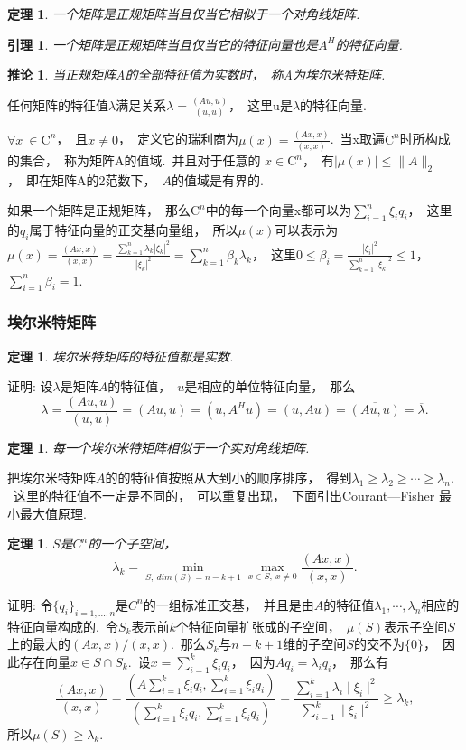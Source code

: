 \documentclass{article}
\begin{document}
\newtheorem{thm}{定理}
\begin{thm}
一个矩阵是正规矩阵当且仅当它相似于一个对角线矩阵.
\end{thm}

\newtheorem{lemma}{引理}
\begin{lemma}
一个矩阵是正规矩阵当且仅当它的特征向量也是$A^H$的特征向量.
\end{lemma}

\newtheorem{corollary}{推论}
\begin{corollary}
当正规矩阵A的全部特征值为实数时，~称A为埃尔米特矩阵.
\end{corollary}
任何矩阵的特征值$\lambda$满足关系$\lambda =\frac{(Au,u)}{(u,u)}$，~这里u是$\lambda$的特征向量.

$\forall x \ \in\mathrm{C}^n$，~且$x\neq 0$，~定义它的瑞利商为$\mu (x)=\frac{(Ax,x)}{(x,x)}$.\ 当x取遍$\mathrm{C}^n$时所构成的集合，~称为矩阵A的值域.\ 并且对于任意的 $x \in\mathrm{C}^n$，~有$|\mu (x)|\leqslant \parallel A\parallel _2$，~即在矩阵A的2范数下，~$A$的值域是有界的.

如果一个矩阵是正规矩阵，~那么$\mathrm{C}^n$中的每一个向量x都可以为$\sum_{i=1}^n \xi _i q_i$，~这里的$q_i$属于特征向量的正交基向量组，~所以$\mu (x)$可以表示为$\mu (x)=\frac{(Ax,x)}{(x,x)}=\frac{\sum_{k=1}^n \lambda _k|\xi _k|^2}{|\xi _k|^2}=\sum_{k=1}^n \beta _k\lambda _k$，~这里$0\leqslant \beta _i=\frac{|\xi _i|^2}{\sum_{k=1}^n |\xi _k|^2}\leqslant 1$，~$\sum_{i=1}^n \beta _i=1$.

\subsubsection{埃尔米特矩阵}
\newtheorem{thm}{定理}
\begin{thm}
埃尔米特矩阵的特征值都是实数.
\end{thm}
证明:
设$\lambda$是矩阵$A$的特征值，~$u$是相应的单位特征向量，~那么
$$\lambda=\frac{(Au,u)}{(u,u)}=(Au,u)=(u,A^{H}u)=(u,Au)=\overline{(Au,u)}=\overline{\lambda}.$$


\newtheorem{thm}{定理}
\begin{thm}
每一个埃尔米特矩阵相似于一个实对角线矩阵.
\end{thm}

把埃尔米特矩阵$A$的的特征值按照从大到小的顺序排序，~得到$\lambda _1\ge \lambda _2\ge \cdots\ge\lambda _n.$\ 这里的特征值不一定是不同的，~可以重复出现，~下面引出Courant—Fisher 最小最大值原理.
\newtheorem{thm}{定理}
\begin{thm}
$S$是$C^n$的一个子空间，$$\lambda _k=\min \limits_{S,\ dim(S)=n-k+1} \max \limits_{x\in S,\ x\neq 0}\frac{(Ax,x)}{(x,x)}.$$
\end{thm}
证明:
令$\lbrace q_i\rbrace _{i=1,\ldots,n}$是$C^n$的一组标准正交基，~并且是由$A$的特征值$\lambda _1,\cdots,\lambda _n$相应的特征向量构成的.\ 令$S_k$表示前$k$个特征向量扩张成的子空间，~$\mu (S)$表示子空间$S$上的最大的$(Ax,x)/(x,x)$.~那么$S_k$与$n-k+1$维的子空间$S$的交不为$\lbrace 0\rbrace$，~因此存在向量$x\in S\cap S_k$.~设$x=\sum_{i=1}^k\xi_iq_i$，~因为$Aq_i=\lambda _iq_i$，~那么有
$$\frac{(Ax,x)}{(x,x)}=\frac{(A\sum_{i=1}^k\xi_iq_i,\sum_{i=1}^k\xi_iq_i)}{(\sum_{i=1}^k\xi_iq_i,\sum_{i=1}^k\xi_iq_i)}=\frac{\sum_{i=1}^k\lambda _i\mid\xi _i\mid ^2}{\sum_{i=1}^k\mid\xi _i\mid ^2}\ge\lambda _k,$$
所以$\mu (S)\ge\lambda _k$.
\end{document}
